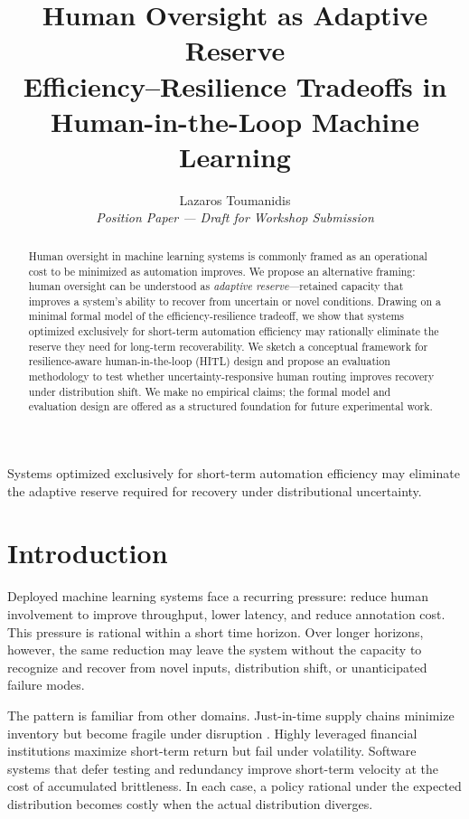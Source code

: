 \documentclass[11pt,a4paper]{article}
\title{%
  \vspace{-1cm}%
  \sffamily\bfseries\LARGE
  Human Oversight as Adaptive Reserve\\[0.5em]
  \large Efficiency--Resilience Tradeoffs in\\
  Human-in-the-Loop Machine Learning%
}
\author{%
  Lazaros Toumanidis\\
  \small\textit{Position Paper --- Draft for Workshop Submission}%
}
\date{}
\theoremstyle{definition}
\theoremstyle{plain}
\theoremstyle{remark}
\begin{document}
\maketitle
\thispagestyle{empty}

\begin{abstract}
Human oversight in machine learning systems is commonly framed as an operational cost to be minimized as automation improves. We propose an alternative framing: human oversight can be understood as \emph{adaptive reserve}---retained capacity that improves a system's ability to recover from uncertain or novel conditions. Drawing on a minimal formal model of the efficiency-resilience tradeoff, we show that systems optimized exclusively for short-term automation efficiency may rationally eliminate the reserve they need for long-term recoverability. We sketch a conceptual framework for resilience-aware human-in-the-loop (HITL) design and propose an evaluation methodology to test whether uncertainty-responsive human routing improves recovery under distribution shift. We make no empirical claims; the formal model and evaluation design are offered as a structured foundation for future experimental work.
\end{abstract}

\begin{claimbox}
Systems optimized exclusively for short-term automation efficiency may eliminate the adaptive reserve required for recovery under distributional uncertainty.
\end{claimbox}

\tableofcontents
\newpage

\section{Introduction}

Deployed machine learning systems face a recurring pressure: reduce human involvement to improve throughput, lower latency, and reduce annotation cost. This pressure is rational within a short time horizon. Over longer horizons, however, the same reduction may leave the system without the capacity to recognize and recover from novel inputs, distribution shift, or unanticipated failure modes.

The pattern is familiar from other domains. Just-in-time supply chains minimize inventory but become fragile under disruption \citep{holling1973}. Highly leveraged financial institutions maximize short-term return but fail under volatility. Software systems that defer testing and redundancy improve short-term velocity at the cost of accumulated brittleness. In each case, a policy rational under the expected distribution becomes costly when the actual distribution diverges.
\end{document}
